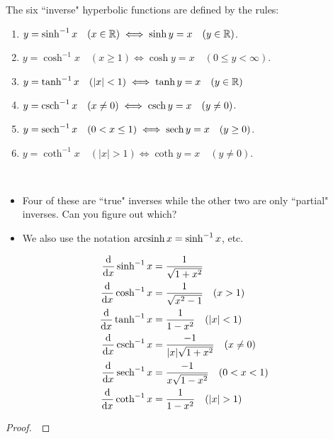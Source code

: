\begin{definition}
The six ``inverse" hyperbolic functions are defined by the rules:
\begin{enumerate}
\item $y=\sinh^{-1} x\quad (x\in\mathbb R) \iff \sinh y = x\quad (y\in\mathbb R)$.
\item $y = \cosh^{-1} x\quad (x\ge 1) \iff \cosh y = x\quad (0\le y<\infty)$.
\item $y = \tanh^{-1} x\quad (|x|<1) \iff \tanh y = x\quad (y\in\mathbb R)$ 
\item $y=\operatorname{csch}^{-1} x\quad (x\ne 0)\iff \operatorname{csch} y = x\quad (y\ne 0)$.
\item $y = \operatorname{sech}^{-1} x\quad (0<x\le 1) \iff \operatorname{sech} y = x\quad (y\ge 0)$.
\item $y = \coth^{-1} x\quad (|x|>1) \iff \coth y = x\quad (y\ne 0)$.
\end{enumerate}
\end{definition}
\begin{remark}\,
\begin{itemize}
\item Four of these are ``true" inverses while the other two are only ``partial" inverses.
Can you figure out which?
\item We also use the notation $\operatorname{arcsinh} x = \sinh^{-1} x$, etc.
\end{itemize}
\end{remark}

\begin{theorem}
\begin{align}
\frac{\dee}{\dee x}\sinh^{-1} x & = \frac{1}{\sqrt{1+x^2}}\\
\frac{\dee}{\dee x}\cosh^{-1} x & = \frac{1}{\sqrt{x^2-1}}\quad (x>1)\\
\frac{\dee}{\dee x}\tanh^{-1} x & = \frac{1}{1-x^2}\quad (|x|<1)\\
\frac{\dee}{\dee x}\csch^{-1} x &=\frac{-1}{|x|\sqrt{1+x^2}}\quad (x\ne 0)\\
\frac{\dee}{\dee x}\sech^{-1} x & = \frac{-1}{x\sqrt{1-x^2}}\quad (0<x<1)\\
\frac{\dee}{\dee x}\coth^{-1} x & = \frac{1}{1-x^2}\quad (|x|>1)
\end{align}
\end{theorem}
\begin{proof}\,

\vspace{2.75in}
\end{proof}

\newpage

